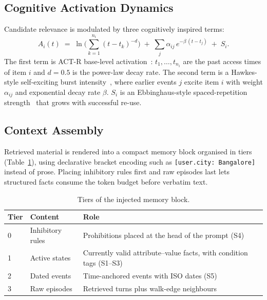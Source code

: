 \documentclass[11pt]{article}
\begin{document}
\subsection{Cognitive Activation Dynamics}
\label{sec:activation}
Candidate relevance is modulated by three cognitively inspired terms:
\begin{equation}
  A_i(t) \;=\; \ln\!\Big(\sum_{k=1}^{n_i}(t-t_k)^{-d}\Big)
  \;+\; \sum_{j}\alpha_{ij}\,e^{-\beta\,(t-t_j)}
  \;+\; S_i .
  \label{eq:activation}
\end{equation}
The first term is ACT-R base-level activation~\cite{anderson1998actr}: $t_1,\dots,t_{n_i}$ are the past access times of item $i$ and $d=0.5$ is the power-law decay rate.
The second term is a Hawkes-style self-exciting burst intensity~\cite{hawkes1971spectra}, where earlier events $j$ excite item $i$ with weight $\alpha_{ij}$ and exponential decay rate $\beta$.
$S_i$ is an Ebbinghaus-style spaced-repetition strength~\cite{ebbinghaus1885memory} that grows with successful re-use.

\subsection{Context Assembly}
\label{sec:context}
Retrieved material is rendered into a compact memory block organised in tiers (Table~\ref{tab:tiers}), using declarative bracket encoding such as \texttt{[user.city: Bangalore]} instead of prose.
Placing inhibitory rules first and raw episodes last lets structured facts consume the token budget before verbatim text.

\begin{table}[t]
\centering
\small
\renewcommand{\arraystretch}{1.15}
\begin{tabularx}{\linewidth}{@{}l l X@{}}
\toprule
\textbf{Tier} & \textbf{Content} & \textbf{Role}\\
\midrule
0 & Inhibitory rules & Prohibitions placed at the head of the prompt (S4)\\
1 & Active states & Currently valid attribute--value facts, with condition tags (S1--S3)\\
2 & Dated events & Time-anchored events with ISO dates (S5)\\
3 & Raw episodes & Retrieved turns plus walk-edge neighbours\\
\bottomrule
\end{tabularx}
\caption{Tiers of the injected memory block.}
\label{tab:tiers}
\end{table}
\end{document}
